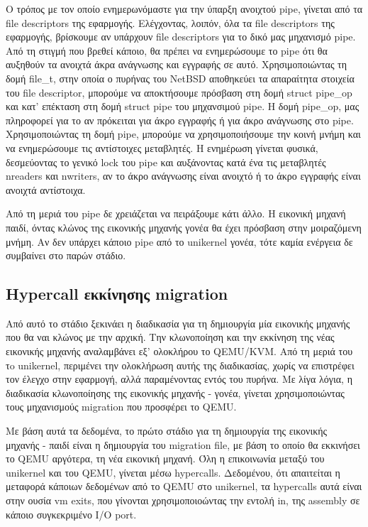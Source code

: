 Ο τρόπος με τον οποίο ενημερωνόμαστε για την ύπαρξη ανοιχτού pipe, γίνεται από
τα file descriptors της εφαρμογής. Ελέγχοντας, λοιπόν, όλα τα file 
descriptors της εφαρμογής, βρίσκουμε αν υπάρχουν file descriptors για το δικό
μας μηχανισμό pipe. Από τη στιγμή που βρεθεί κάποιο, θα πρέπει να ενημερώσουμε
το pipe ότι θα αυξηθούν τα ανοιχτά άκρα ανάγνωσης και εγγραφής σε αυτό.
Χρησιμοποιώντας τη δομή file\_t, στην οποία ο πυρήνας του NetBSD αποθηκεύει τα
απαραίτητα στοιχεία του file descriptor, μπορούμε να αποκτήσουμε πρόσβαση στη
δομή struct pipe\_op και κατ' επέκταση στη δομή struct pipe του μηχανσιμού pipe.
Η δομή pipe\_op, μας πληροφορεί για το αν πρόκειται για άκρο εγγραφής ή για άκρο
ανάγνωσης στο pipe. Χρησιμοποιώντας τη δομή pipe, μπορούμε να χρησιμοποιήσουμε
την κοινή μνήμη και να ενημερώσουμε τις αντίστοιχες μεταβλητές. Η ενημέρωση
γίνεται φυσικά, δεσμεύοντας το γενικό lock του pipe και αυξάνοντας κατά ένα τις
μεταβλητές nreaders και nwriters, αν το άκρο ανάγνωσης είναι ανοιχτό ή το άκρο
εγγραφής είναι ανοιχτά αντίστοιχα. 

Από τη μεριά του pipe δε χρειάζεται να πειράξουμε κάτι άλλο. Η εικονική μηχανή
παιδί, όντας κλώνος της εικονικής μηχανής γονέα θα έχει πρόσβαση στην
μοιραζόμενη μνήμη. Αν δεν υπάρχει κάποιο pipe από το unikernel γονέα, τότε καμία
ενέργεια δε συμβαίνει στο παρών στάδιο.

\subsection{Hypercall εκκίνησης migration}

Από αυτό το στάδιο ξεκινάει η διαδικασία για τη δημιουργία μία εικονικής μηχανής
που θα ναι κλώνος με την αρχική. Την κλωνοποίηση και την εκκίνηση της νέας
εικονικής μηχανής αναλαμβάνει εξ' ολοκλήρου το QEMU/KVM. Από τη μεριά του τo 
unikernel, περιμένει την ολοκλήρωση αυτής της διαδικασίας, χωρίς να επιστρέφει
τον έλεγχο στην εφαρμογή, αλλά παραμένοντας εντός του πυρήνα. Με λίγα λόγια, η
διαδικασία κλωνοποίησης της εικονικής μηχανής - γονέα, γίνεται χρησιμοποιώντας
τους μηχανισμούς migration που προσφέρει το QEMU. 

Με βάση αυτά τα δεδομένα, το πρώτο στάδιο για τη δημιουργία της εικονικής
μηχανής - παιδί είναι η δημιουργία του migration file, με βάση το οποίο θα
εκκινήσει το QEMU αργότερα, τη νέα εικονική μηχανή. Όλη η επικοινωνία μεταξύ του
unikernel και του QEMU, γίνεται μέσω hypercalls. Δεδομένου, ότι απαιτείται η
μεταφορά κάποιων δεδομένων από το QEMU στο unikernel, τα hypercalls αυτά είναι
στην ουσία vm exits, που γίνονται χρησιμοποιοώντας την εντολή in, της assembly
σε κάποιο συγκεκριμένο I/O port. 

